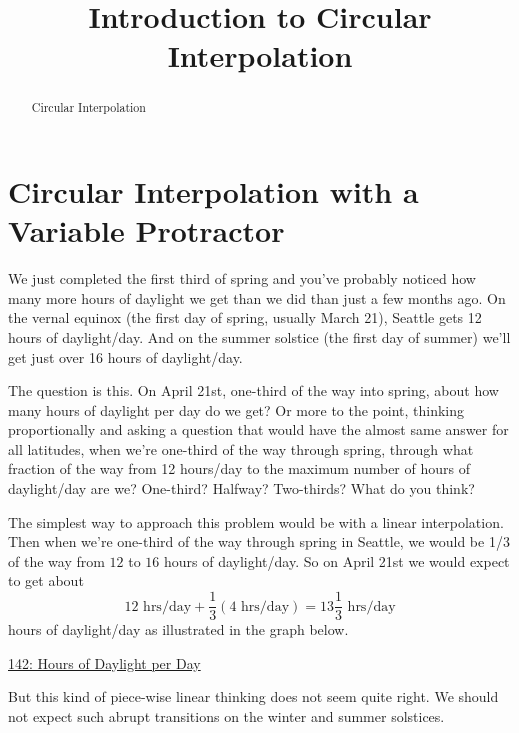 \documentclass{ximera}
\title{Introduction to Circular Interpolation}
\begin{document}
\begin{abstract}
Circular Interpolation
\end{abstract}
\maketitle

\section{Circular Interpolation with a Variable Protractor}

\begin{example}  \label{Ex:LLL}
We just completed the first third of spring and you've probably noticed how many more hours of daylight we get than we did than just a few months ago. On the vernal equinox (the first day of spring, usually March 21), Seattle gets 12 hours of daylight/day. And on the summer solstice (the first day of summer) we'll get just over 16 hours of daylight/day. 

The question is this. On April 21st, one-third of the way into spring, about how many hours of daylight per day do we get? Or more to the point, thinking proportionally and asking a question that would have the almost same answer for all latitudes, when we're one-third of the way through spring, through what fraction of the way from 12 hours/day to the maximum number of hours of daylight/day are we? One-third? Halfway? Two-thirds? What do you think?

The simplest way to approach this problem would be with a linear interpolation. Then when we're one-third of the way through spring in Seattle, we would be 1/3 of the way from $12$ to $16$ hours of daylight/day. So on April 21st we would expect to get about
\[
    12 \text{ hrs/day} + \frac{1}{3}(4 \text{ hrs/day}) = 13 \frac{1}{3}\text{ hrs/day}
\]
hours of daylight/day as illustrated in the graph below.


\begin{onlineOnly}
    \begin{center}
\end{center}
\end{onlineOnly}

\href{https://www.desmos.com/calculator/esj3yytaug}{142: Hours of Daylight per Day}

But this kind of piece-wise linear thinking does not seem quite right. We should not expect such abrupt transitions on the winter and summer solstices.


\end{example}
\end{document}

